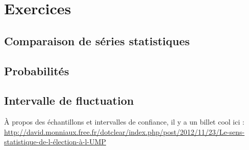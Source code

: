 \section{Exercices}

\subsection{Comparaison de séries statistiques}


\subsection{Probabilités}


\subsection{Intervalle de fluctuation}




À propos des échantillons et intervalles de confiance, il y a un billet cool ici :
\url{http://david.monniaux.free.fr/dotclear/index.php/post/2012/11/23/Le-sens-statistique-de-l-élection-à-l-UMP}



